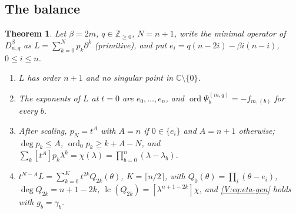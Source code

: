 \documentclass[11pt,a4paper]{article}
\newtheorem{theorem}{Theorem}[section]
\theoremstyle{definition}
\theoremstyle{remark}
\newcommand{\C}{\mathbb C}
\newcommand{\Z}{\mathbb Z}
\newcommand{\cl}[1]{\lceil #1\rceil}
\DeclareMathOperator{\ord}{ord}
\DeclareMathOperator{\lc}{lc}
\numberwithin{equation}{section}
\begin{document}
\subsection{The balance}

\begin{theorem}\label{V:thm:even-t}
Let $\beta=2m$, $q\in\Z_{\ge0}$, $N=n+1$, write the minimal operator of $D^\beta_{n,q}$ as $L=\sum_{k=0}^Np_k\partial^k$ \textup{(}primitive\textup{)}, and put $e_i=q(n-2i)-\beta i(n-i)$, $0\le i\le n$.
\begin{enumerate}
\item[(i)] $L$ has order $n+1$ and no singular point in $\C\setminus\{0\}$.
\item[(ii)] The exponents of $L$ at $t=0$ are $e_0,\dots,e_n$, and $\ord\Psi^{(m,q)}_b=-f_{m,(b)}$ for every $b$.
\item[(iii)] After scaling, $p_N=t^A$ with $A=n$ if $0\in\{e_i\}$ and $A=n+1$ otherwise; $\deg p_k\le A$, $\ord_0p_k\ge k+A-N$, and $\sum_k[t^A]p_k\lambda^k=\chi(\lambda)=\prod_{b=0}^n(\lambda-\lambda_b)$.
\item[(iv)] $t^{N-A}L=\sum_{k=0}^{K}t^{2k}Q_{2k}(\theta)$, $K=\cl{n/2}$, with $Q_0(\theta)=\prod_i(\theta-e_i)$, $\deg Q_{2k}=n+1-2k$, $\lc(Q_{2k})=[\lambda^{n+1-2k}]\chi$, and \eqref{V:eq:eta-gen} holds with $g_b=\gamma_b$.
\end{enumerate}
\end{theorem}
\end{document}
